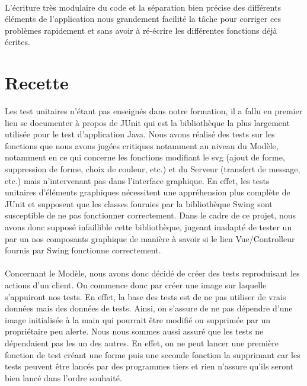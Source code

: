\documentclass[a4paper,11pt]{article}
\begin{document}
\paragraph{} L'écriture très modulaire du code et la séparation bien précise des différents éléments de l'application nous grandement facilité la tâche pour corriger ces problèmes rapidement et sans avoir à ré-écrire les différentes fonctions déjà écrites.

\section{Recette}

Les test unitaires n'\'etant pas enseign\'es dans notre formation, il a fallu en premier lieu se documenter \`a propos de JUnit qui est la bibliothèque la plus largement utilisée pour le test d'application Java. Nous avons r\'ealis\'e des tests sur les fonctions que nous avons jugées critiques notamment au niveau du Modèle, notamment en ce qui concerne les fonctions modifiant le svg (ajout de forme, suppression de forme, choix de couleur, etc.) et du Serveur (transfert de message, etc.)  mais n'intervenant pas dans l'interface graphique. En effet, les tests unitaires d'\'el\'ements graphiques n\'ecessitent une appr\'ehension plus compl\`ete de JUnit et supposent que les classes fournies par la biblioth\`eque Swing sont susceptible de ne pas fonctionner correctement. Dans le cadre de ce projet, nous avons donc suppos\'e infaillible cette biblioth\`eque, jugeant inadapté de tester un par un nos composants graphique de manière à savoir si le lien Vue/Controlleur fournis par Swing fonctionne correctement.

\paragraph{} Concernant le Modèle, nous avons donc décidé de créer des tests reproduisant les actions d'un client. On commence donc par créer une image sur laquelle s'appuiront nos tests. En effet, la base des tests est de ne pas utiliser de vrais données mais des données de tests. Ainsi, on s'assure de ne pas dépendre d'une image initialisée à la main qui pourrait être modifié ou supprimée par un propriétaire peu alerte. Nous nous sommes aussi assuré que les tests ne dépendaient pas les un des autres. En effet, on ne peut lancer une première fonction de test créant une forme puis une seconde fonction la supprimant car les tests peuvent être lancés par des programmes tiers et rien n'assure qu'ils seront bien lancé dans l'ordre souhaité. 
\end{document}
